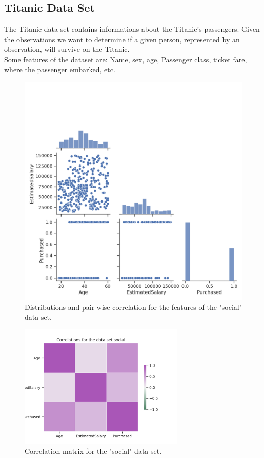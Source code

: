 \documentclass{article}
\begin{document}
\subsection{Titanic Data Set}
The Titanic data set \cite{titanic} contains informations about the Titanic's passengers. Given the observations we want to determine if a given person, represented by an observation, will survive on the Titanic.\\
Some features of the dataset are: Name, sex, age, Passenger class, ticket fare, where the passenger embarked, etc.

\begin{figure}[h!]
	\centering
	\includegraphics[width=\textwidth]{../plots/social_pairplot.png}
	\caption{ Distributions and pair-wise correlation for the features of the "social" data set.}
	\label{pairplot_income}
\end{figure}


\begin{figure}[h!]
	\centering
	\includegraphics[width=0.7\textwidth]{../plots/social_correlations.png}
	\caption{Correlation matrix for the "social" data set. }
	\label{correlation_income}
\end{figure}
\end{document}
